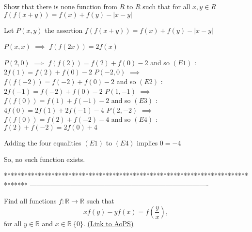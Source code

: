 \begin{solution}
	\begin{tcolorbox}Show that there is none function from $ R$ to $ R$ such that 
for all $ x,y\in R$
$ f(f(x + y)) = f(x) + f(y) - |x - y|$\end{tcolorbox}

Let $ P(x,y)$ the assertion $ f(f(x+y))=f(x)+f(y)-|x-y|$

$ P(x,x)$ $ \implies$ $ f(f(2x))=2f(x)$

$ P(2,0)$ $ \implies$ $ f(f(2))=f(2)+f(0)-2$ and so  $ (E1)$ : $ 2f(1)=f(2)+f(0)-2$
$ P(-2,0)$ $ \implies$ $ f(f(-2))=f(-2)+f(0)-2$ and so  $ (E2)$ : $ 2f(-1)=f(-2)+f(0)-2$
$ P(1,-1)$ $ \implies$ $ f(f(0))=f(1)+f(-1)-2$ and so  $ (E3)$ : $ 4f(0)=2f(1)+2f(-1)-4$
$ P(2,-2)$ $ \implies$ $ f(f(0))=f(2)+f(-2)-4$ and so  $ (E4)$ : $ f(2)+f(-2)=2f(0)+4$

Adding the four equalities $ (E1)$ to $ (E4)$ implies $ 0=-4$

So, no such function exists.
\end{solution}
*******************************************************************************
-------------------------------------------------------------------------------

\begin{problem}
	Find all functions $ f: \mathbb R \longrightarrow \mathbb R$ such that 
\[ xf(y) - yf(x) = f\left(\frac {y}{x}\right),\] for all $ y\in \mathbb R$ and $ x\in \mathbb R\ 
\{0\}$.
	\flushright \href{https://artofproblemsolving.com/community/c6h274494}{(Link to AoPS)}
\end{problem}



